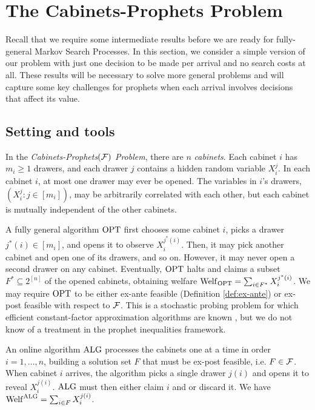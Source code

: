 \section{The Cabinets-Prophets Problem} \label{sec:non-pandora}

Recall that we require some intermediate results before we are ready for fully-general Markov Search Processes.
In this section, we consider a simple version of our problem with just one decision to be made per arrival and no search costs at all.
These results will be necessary to solve more general problems and will capture some key challenges for prophets when each arrival involves decisions that affect its value.

\subsection{Setting and tools}

In the \emph{Cabinets-Prophets$(\mathcal{F})$ Problem}, there are $n$ \emph{cabinets}.
Each cabinet $i$ has $m_i \geq 1$ drawers, and each drawer $j$ contains a hidden random variable $X_i^j$.
In each cabinet $i$, at most one drawer may ever be opened.
The variables in $i$'s drawers, $(X_i^j : j \in [m_i])$, may be arbitrarily correlated with each other, but each cabinet is mutually independent of the other cabinets.

A fully general algorithm $\mathrm{OPT}$ first chooses some cabinet $i$, picks a drawer $j^*(i) \in [m_i]$, and opens it to observe $X_i^{j^*(i)}$.
Then, it may pick another cabinet and open one of its drawers, and so on.
However, it may never open a second drawer on any cabinet.
Eventually, $\mathrm{OPT}$ halts and claims a subset $F^* \subseteq 2^{[n]}$ of the opened cabinets, obtaining welfare $\mathrm{Welf}_{\mathrm{OPT}} = \sum_{i \in F^*} X_i^{j^*(i)}$.
We may require $\mathrm{OPT}$ to be either ex-ante feasible (Definition \ref{def:ex-ante}) or ex-post feasible with respect to $\mathcal{F}$.
This is a stochastic probing problem for which efficient constant-factor approximation algorithms are known \citep{asadpour2016maximizing, beyhaghi2019pandora}, but we do not know of a treatment in the prophet inequalities framework.

An online algorithm $\mathrm{ALG}$ processes the cabinets one at a time in order $i=1,\dots,n$, building a solution set $F$ that must be ex-post feasible, i.e. $F \in \mathcal{F}$.
When cabinet $i$ arrives, the algorithm picks a single drawer $j(i)$ and opens it to reveal $X_i^{j(i)}$.
$\mathrm{ALG}$ must then either claim $i$ and or discard it.
We have $\mathrm{Welf}^{\mathrm{ALG}} = \sum_{i \in F} X_i^{j(i)}$.



